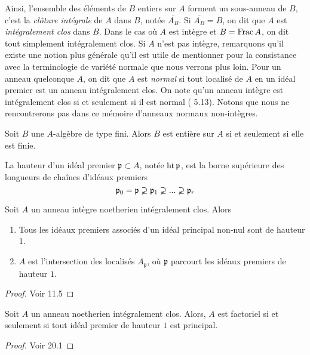 Ainsi, l'ensemble des éléments de $B$ entiers sur $A$ forment un sous-anneau de $B$, c'est la \textit{clôture intégrale} de $A$ dans $B$, notée $\overline{A_B}$. Si $\overline{A_B}=B$, on dit que $A$ est \textit{intégralement clos} dans $B$. Dans le cas où $A$ est intègre et $B=\operatorname{Frac} A$, on dit tout simplement intégralement clos. Si $A$ n'est pas intègre, remarquons qu'il existe une notion plus générale qu'il est utile de mentionner pour la consistance avec la terminologie de variété normale que nous verrons plus loin. Pour un anneau quelconque $A$, on dit que $A$ est \textit{normal} si tout localisé de $A$ en un idéal premier est un anneau intégralement clos. On note qu'un anneau intègre est intégralement clos si et seulement si il est normal (\cite{atiyahmacdo} 5.13). Notons que nous ne rencontrerons pas dans ce mémoire d'anneaux normaux non-intègres.

\begin{cor}
Soit $B$ une $A$-algèbre de type fini. Alors $B$ est entière sur $A$ si et seulement si elle est finie.
\end{cor}

\begin{defn}
La hauteur d'un idéal premier $\mathfrak{p}\subset A$, notée $\operatorname{ht} \mathfrak{p}$, est la borne supérieure des longueurs de chaînes d'idéaux premiers
$$\mathfrak{p}_0=\mathfrak{p}\varsupsetneq \mathfrak{p}_1 \varsupsetneq...\varsupsetneq  \mathfrak{p}_r$$
\end{defn}


\begin{thm}\label{factonormal}
Soit $A$ un anneau intègre noetherien intégralement clos. Alors
\begin{enumerate}
\item Tous les idéaux premiers associés d'un idéal principal non-nul sont de hauteur 1.
\item $A$ est l'intersection des localisés $A_\mathfrak{p}$, où $\mathfrak{p}$ parcourt les idéaux premiers de hauteur $1$.
\end{enumerate}
\end{thm}
\begin{proof}
Voir \cite{Matsumura} 11.5
\end{proof}


\begin{thm}\label{UFDPID}
Soit $A$ un anneau noetherien intégralement clos. Alors,
$A$ est factoriel si et seulement si tout idéal premier de hauteur $1$ est principal.
\end{thm}
\begin{proof}
Voir \cite{Matsumura} 20.1
\end{proof}

